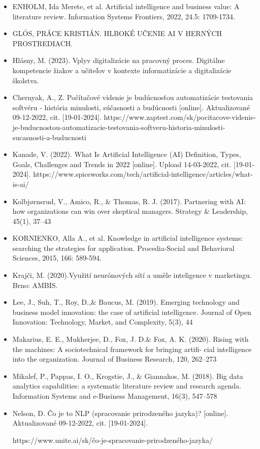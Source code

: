 \begin{itemize}
    \item ENHOLM, Ida Merete, et al. Artificial intelligence and business value: A literature review. Information Systems Frontiers, 2022, 24.5: 1709-1734.
    \item GLÓS, PRÁCE KRISTIÁN. HLBOKÉ UČENIE AI V HERNÝCH PROSTREDIACH.
    \item Hlásny, M. (2023). Vplyv digitalizácie na pracovný proces. Digitálne kompetencie žiakov a učiteľov v kontexte informatizácie a digitalizácie školstva.
    \item Chernyak, A., Z. Počítačové videnie je budúcnosťou automatizácie testovania softvéru - história minulosti, súčasnosti a budúcnosti [online]. Aktualizované  09-12-2022, cit. [19-01-2024]. https://www.zaptest.com/sk/pocitacove-videnie-je-buducnostou-automatizacie-testovania-softveru-historia-minulosti-sucasnosti-a-buducnosti
    \item Kanade, V. (2022). What Is Artificial Intelligence (AI) Definition, Types, Goals, Challenges and Trends in 2022 [online]. Upload 14-03-2022, cit. [19-01-2024]. https://www.spiceworks.com/tech/artificial-intelligence/articles/what-is-ai/
    \item Kolbjørnsrud, V., Amico, R., \& Thomas, R. J. (2017). Partnering with AI: how organizations can win over skeptical managers. Strategy \& Leadership, 45(1), 37–43
    \item KORNIENKO, Alla A., et al. Knowledge in artificial intelligence systems: searching the strategies for application. Procedia-Social and Behavioral Sciences, 2015, 166: 589-594.
    \item Krajči, M. (2020).Využití neurónových sítí a uměle inteligence v marketingu. Brno: AMBIS.
    \item Lee, J., Suh, T., Roy, D.,\& Baucus, M. (2019). Emerging technology and business model innovation: the case of artificial intelligence. Journal of Open Innovation: Technology, Market, and Complexity, 5(3), 44
    \item Makarius, E. E., Mukherjee, D., Fox, J. D.\& Fox, A. K. (2020). Rising with the machines: A sociotechnical framework for bringing artifi- cial intelligence into the organization. Journal of Business Research, 120, 262–273
    \item Mikalef, P., Pappas, I. O., Krogstie, J., \& Giannakos, M. (2018). Big data analytics capabilities: a systematic literature review and research agenda. Information Systems and e-Business Management, 16(3), 547–578
    \item Nelson, D. Čo je to NLP (spracovanie prirodzeného jazyka)? [online]. Aktualizované  09-12-2022, cit. [19-01-2024]. \par https://www.unite.ai/sk/čo-je-spracovanie-prirodzeného-jazyka/

\end{itemize}

